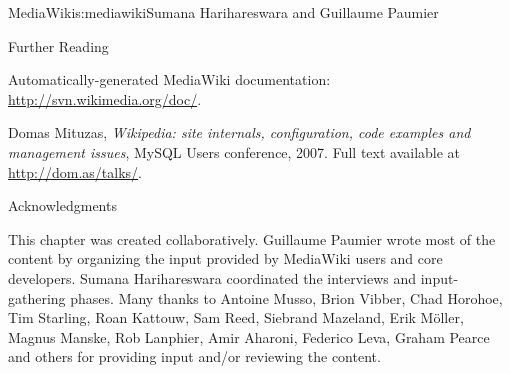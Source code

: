 \begin{aosachapter}{MediaWiki}{s:mediawiki}{Sumana Harihareswara and Guillaume Paumier}
\begin{aosasect1}{Further Reading}
\begin{aosaitemize}
\item Automatically-generated MediaWiki documentation:
  \url{http://svn.wikimedia.org/doc/}.

\item Domas Mituzas, \emph{Wikipedia: site internals, configuration,
  code examples and management issues}, MySQL Users conference,
  2007. Full text available at \url{http://dom.as/talks/}.

\end{aosaitemize}

\end{aosasect1}

\begin{aosasect1}{Acknowledgments}

This chapter was created collaboratively. Guillaume Paumier wrote most
of the content by organizing the input provided by MediaWiki users and
core developers. Sumana Harihareswara coordinated the interviews and
input-gathering phases. Many thanks to Antoine Musso, Brion Vibber,
Chad Horohoe, Tim Starling, Roan Kattouw, Sam Reed, Siebrand Mazeland,
Erik M\"{o}ller, Magnus Manske, Rob Lanphier, Amir Aharoni, Federico Leva,
Graham Pearce and others for providing input and/or reviewing the
content.

\end{aosasect1}

\end{aosachapter}
